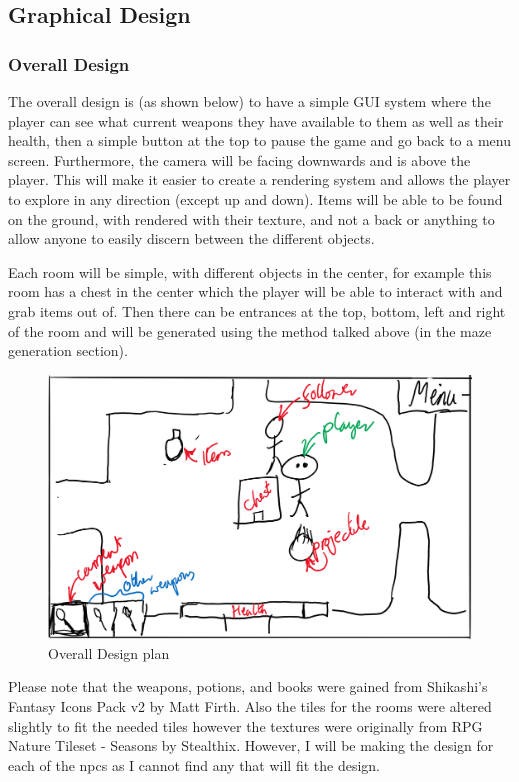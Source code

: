 \documentclass[../Main.tex]{subfiles}
\begin{document}
    \clearpage
    \subsection{Graphical Design}
        \subsubsection{Overall Design}
            The overall design is (as shown below) to have a simple GUI system where the player can see what current weapons they have available to them as well as their health, then a simple button at the top to pause the game and go back to a menu screen. Furthermore, the camera will be facing downwards and is above the player. This will make it easier to create a rendering system and allows the player to explore in any direction (except up and down). Items will be able to be found on the ground, with rendered with their texture, and not a back or anything to allow anyone to easily discern between the different objects.

            Each room will be simple, with different objects in the center, for example this room has a chest in the center which the player will be able to interact with and grab items out of. Then there can be entrances at the top, bottom, left and right of the room and will be generated using the method talked above (in the maze generation section).
            \begin{figure}[hbt!]
                \centerline{\includegraphics[scale=0.3]{img/Design/Overall Design.png}}
                \caption{Overall Design plan}
                \label{fig:OverallDesign}
            \end{figure}

            Please note that the weapons, potions, and books were gained from Shikashi's Fantasy Icons Pack v2 by Matt Firth. Also the tiles for the rooms were altered slightly to fit the needed tiles however the textures were originally from RPG Nature Tileset - Seasons by Stealthix. However, I will be making the design for each of the npcs as I cannot find any that will fit the design.
\end{document}
